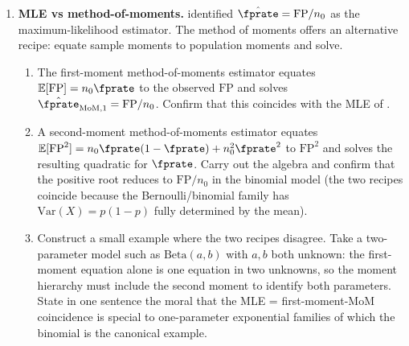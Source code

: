 \begin{enumerate}
\item \exstarstarstar
\label{ex:ch7-9}
\textbf{MLE vs method-of-moments.}
 identified $\hat{\fprate} = \mathrm{FP}/n_0$
as the maximum-likelihood estimator. The method of moments offers an
alternative recipe: equate sample moments to population moments and
solve.
\begin{enumerate}
  \item[(a)] The first-moment method-of-moments estimator equates
    $\mathbb{E}[\mathrm{FP}] = n_0 \fprate$ to the observed
    $\mathrm{FP}$ and solves $\hat{\fprate}_{\mathrm{MoM},1} =
    \mathrm{FP}/n_0$. Confirm that this coincides with the MLE of
    .
  \item[(b)] A second-moment method-of-moments estimator equates
    $\mathbb{E}[\mathrm{FP}^2] = n_0 \fprate (1 - \fprate) + n_0^2
    \fprate^2$ to $\mathrm{FP}^2$ and solves the resulting
    quadratic for $\fprate$. Carry out the algebra and confirm
    that the positive root reduces to $\mathrm{FP}/n_0$ in the
    binomial model (the two recipes coincide because the
    Bernoulli/binomial family has $\mathrm{Var}(X) = p(1-p)$
    fully determined by the mean).
  \item[(c)] Construct a small example where the two recipes
    disagree. Take a two-parameter model such as $\mathrm{Beta}(a,
    b)$ with $a, b$ both unknown: the first-moment equation alone
    is one equation in two unknowns, so the moment hierarchy must
    include the second moment to identify both parameters. State
    in one sentence the moral that the MLE = first-moment-MoM
    coincidence is special to one-parameter exponential families
    of which the binomial is the canonical example.
\end{enumerate}


\end{enumerate}
